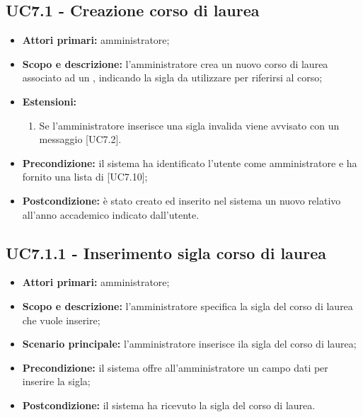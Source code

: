\documentclass[AnalisiDeiRequisiti.tex]{subfiles}
\begin{document}
\subsection{UC7.1 - Creazione corso di laurea}
\begin{itemize}
	\item \textbf{Attori primari:} amministratore;
	\item \textbf{Scopo e descrizione:} l'amministratore crea un nuovo corso di laurea associato ad un , indicando la sigla da utilizzare per riferirsi al corso;
	\item \textbf{Estensioni:}
		\begin{enumerate}
			\item Se l'amministratore inserisce una sigla invalida viene avvisato con un messaggio [UC7.2].
		\end{enumerate}
	\item \textbf{Precondizione:} il sistema ha identificato l'utente come amministratore e ha fornito una lista di  [UC7.10];
	\item \textbf{Postcondizione:} è stato creato ed inserito nel sistema un nuovo  relativo all'anno accademico indicato dall'utente.
\end{itemize}
\subsection{UC7.1.1 - Inserimento sigla corso di laurea}
\begin{itemize}
	\item \textbf{Attori primari:} amministratore;
	\item \textbf{Scopo e descrizione:} l'amministratore specifica la sigla del corso di laurea che vuole inserire;
	\item \textbf{Scenario principale:} l'amministratore inserisce ila sigla del corso di laurea;
	\item \textbf{Precondizione:} il sistema offre all'amministratore un campo dati per inserire la sigla; 
	\item \textbf{Postcondizione:} il sistema ha ricevuto la sigla del corso di laurea.
\end{itemize}
\end{document}
